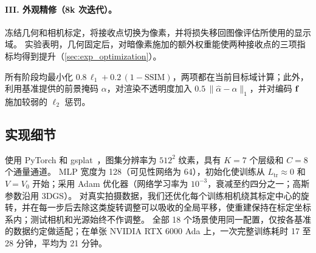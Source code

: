 \paragraph{III. 外观精修（8k 次迭代）。}
冻结几何和相机标定，将接收点切换为像素，并将损失移回图像评估所使用的显示域。
实验表明，几何固定后，对暗像素施加的额外权重能使两种接收点的三项指标均得到提升（\cref{sec:exp_optimization}）。

所有阶段均最小化 $0.8\,\ell_1+0.2\,(1-\mathrm{SSIM})$，两项都在当前目标域计算；此外，利用基准提供的前景掩码 $\alpha$，对渲染不透明度加入 $0.5\,\|\hat\alpha-\alpha\|_1$，并对编码 $\mathbf{f}$ 施加较弱的 $\ell_2$ 惩罚。

\subsection{实现细节}
\label{sec:implementation}
\ours 使用 PyTorch 和 gsplat~\cite{ye2025gsplat}，图集分辨率为 $512^2$ 纹素，具有 $K=7$ 个层级和 $C=8$ 个通量通道。
MLP 宽度为 128（可见性网络为 64），初始化使训练从 $L_{\mathrm{tr}}\approx 0$ 和 $V=V_0$ 开始；采用 Adam 优化器（网络学习率为 $10^{-3}$，衰减至约四分之一；高斯参数沿用 3DGS）。
对真实拍摄数据，我们还优化每个训练相机绕其标定中心的旋转，并在每一步后去除这类旋转调整可以吸收的全局平移，使重建保持在标定坐标系内；测试相机和光源始终不作调整。
全部 18 个场景使用同一配置，仅按各基准的数据约定做适配；在单张 NVIDIA RTX 6000 Ada 上，一次完整训练耗时 17 至 28 分钟，平均为 21 分钟。
